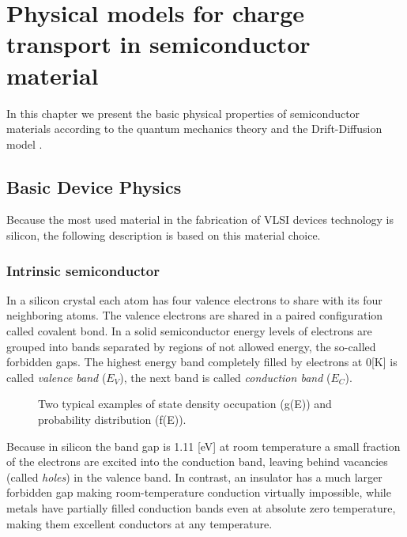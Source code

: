 \chapter{Physical models for charge transport in semiconductor material}

In this chapter we present the basic physical properties of semiconductor materials according to the quantum mechanics theory \citep{ModernVLSIdevices} and the Drift-Diffusion model \cite{Jackson:ElettroClassica}.

\section{Basic Device Physics}

Because the most used material in the fabrication of VLSI devices technology is silicon, the following description is based on this material choice.

\subsection{Intrinsic semiconductor}
In a silicon crystal each atom has four valence electrons to share with its four neighboring atoms. The valence electrons are shared in a paired configuration called covalent bond.  In a solid semiconductor energy levels of electrons are grouped into bands separated by regions of not allowed energy, the so-called forbidden gaps. The highest energy band completely filled by electrons at 0[K] is called \textit{valence band} ($E_V$), the next band is called \textit{conduction band} ($E_C$).

\begin{figure}[!h]
\centering
{}
\caption{Two typical examples of state density occupation (g(E)) and probability distribution (f(E)).  }
\label{fig: density occupation and prob}
\end{figure}

Because in silicon the band gap is 1.11 [eV] \cite{SolidState} at room temperature a small fraction of the electrons are excited into the conduction band, leaving behind vacancies (called \textit{holes}) in the valence band.
In contrast, an insulator has a much larger forbidden gap making room-temperature conduction virtually impossible, while metals have partially filled conduction bands even at absolute zero temperature, making them excellent conductors at any temperature. 

